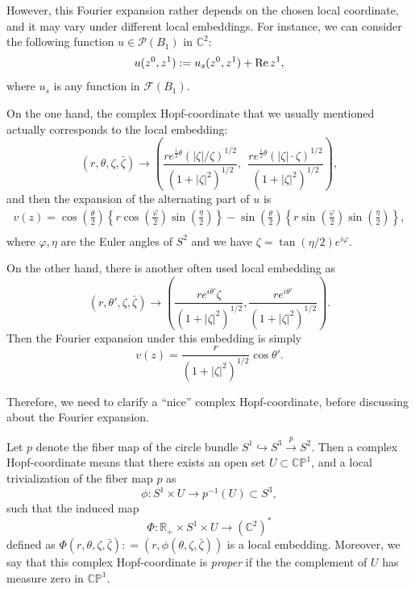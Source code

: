\documentclass[a4paper,11pt]{amsart}
\numberwithin{equation}{section}
\def\Re{\mathop{\rm Re}\nolimits}
\def\cP{{\mathcal P}}
\def\cF{{\mathcal F}}
\def\cP{{\mathcal P}}
\let\vp=\varphi
\def\bC{{\mathbb C}}
\def\bR{{\mathbb R}}
\def\bP{{\mathbb P}}
\def\z{{\zeta}}
\begin{document}
However, 
this Fourier expansion rather depends on the chosen local coordinate, 
and it may vary under different local embeddings. 
For instance, we can consider the following function $u\in \cP(B_1)$ in $\bC^2$: 
\begin{equation}
\label{fe-0001}
u(z^0, z^1): = u_s(z^0, z^1) +  \Re z^1,  
\end{equation}
where $u_s$ is any function in $\cF(B_1)$. 

On the one hand, 
the complex Hopf-coordinate that we usually mentioned 
actually corresponds to the local embedding: 
\begin{equation}
\label{fe-000}
 (r, \theta, \z, \bar\z) \rightarrow \left( \frac{  r e^{\frac{i}{2}\theta } ( |\z| / \z)^{1/2}}{(1+ |\z|^2)^{1/2}},  \ \
\frac{  r e^{\frac{i}{2}\theta } (|\z| \cdot \z)^{1/2}}{(1+ |\z|^2)^{1/2}}  \right), 
\end{equation}
and then the expansion of the alternating part of $u$ is  
\begin{eqnarray}
\label{fe-001}
v(z) =  \cos\left(\frac{\theta}{2}\right) \left\{ r  \cos\left(\frac{\vp}{2}\right)  \sin\left(\frac{\eta}{2}\right)  \right\}
- \sin\left(\frac{\theta}{2}\right) \left\{ r  \sin\left(\frac{\vp}{2}\right)  \sin\left(\frac{\eta}{2}\right)  \right\}, 
\nonumber\\
\end{eqnarray}
where $\vp, \eta$ are the Euler angles of $S^2$ and we have 
$ \z = \tan(\eta/2)e^{i\vp}$. 

On the other hand, 
there is another often used local embedding as 
\begin{equation}
\label{fe-0011}
(r, \theta', \z, \bar\z) \rightarrow \left( \frac{re^{i\theta'} \z}{(1+ |\z|^2)^{1/2}},  \frac{re^{i\theta'}}{(1+ |\z|^2)^{1/2} }  \right). 
\end{equation}
Then the Fourier expansion under this embedding is simply  
\begin{equation}
\label{fe-002}
v(z) =  \frac{r}{(1+ |\z|^2)^{1/2}} \cos\theta'. 
\end{equation}

Therefore, we need to clarify a ``nice'' complex Hopf-coordinate, 
before discussing about the Fourier expansion. 

Let $p$ denote the fiber map of the circle bundle $ S^1\hookrightarrow S^3\xrightarrow{p} S^2 $.
Then a complex Hopf-coordinate  means that 
there exists an open set $U\subset \bC\bP^1$,
and a local trivialization of the fiber map $p$ as 
$$ \phi: S^1\times U \rightarrow p^{-1} (U) \subset S^3, $$
such that the induced map  
$$ \Phi: \bR_+ \times S^1\times U \rightarrow (\bC^2)^* $$
defined as $\Phi (r, \theta, \z, \bar\z): = (r, \phi(\theta, \z, \bar\z))$ is a local embedding. 
Moreover, we say that this complex Hopf-coordinate is \emph{proper}
if the the complement of $U$ has measure zero in $\bC\bP^1$. 
\end{document}
